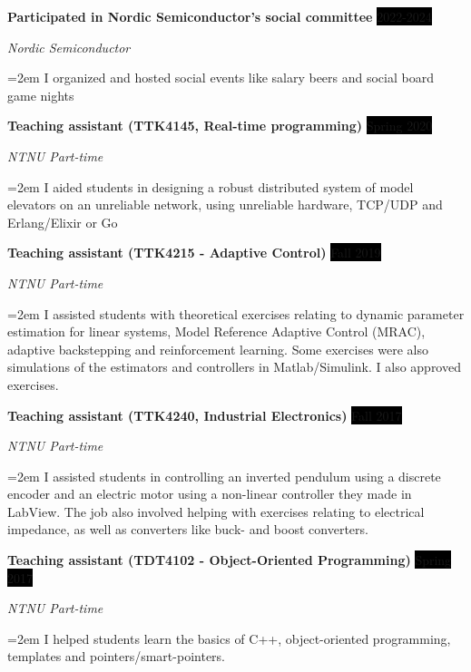 \documentclass[paper=a4,fontsize=11pt,norsk]{scrartcl} %
\newcommand{\EducationEntry}[4]{
		\noindent \textbf{#1} \hfill      %
		\colorbox{Black}{%
			\parbox{6em}{%
			\hfill\color{White}#2}} \par  %
		\noindent \textit{#3} \par        %
		\noindent\hangindent=2em\hangafter=0 \small #4 %
		\normalsize \par}
\newcommand{\WorkEntry}[4]{				  %
		\noindent \textbf{#1} \hfill      %
		\colorbox{Black}{\color{White}#2} \par  %
		\noindent \textit{#3} \par              %
		\noindent\hangindent=2em\hangafter=0 \small #4 %
		\normalsize \par}
\begin{document}




\WorkEntry{Participated in Nordic Semiconductor's social committee}{2022-2024}{Nordic Semiconductor}
{I organized and hosted social events like salary beers and social board game nights}

\WorkEntry{Teaching assistant (TTK4145, Real-time programming)}{Spring 2020}{NTNU Part-time}
{I aided students in designing a robust distributed system of model elevators on an unreliable network, using unreliable hardware, TCP/UDP and Erlang/Elixir or Go}

\WorkEntry{Teaching assistant (TTK4215 - Adaptive Control)}{Fall 2019}{NTNU Part-time}
{I assisted students with theoretical exercises relating to dynamic parameter estimation for linear systems, Model Reference Adaptive Control (MRAC), adaptive backstepping and reinforcement learning. Some exercises were also simulations of the estimators and controllers in Matlab/Simulink. I also approved exercises.
}


\WorkEntry{Teaching assistant (TTK4240, Industrial Electronics)}{Fall 2017}{NTNU Part-time}
{I assisted students in controlling an inverted pendulum using a discrete encoder and an electric motor using a non-linear controller they made in LabView. The job also involved helping with exercises relating to electrical impedance, as well as converters like buck- and boost converters.
}

\WorkEntry{Teaching assistant (TDT4102 - Object-Oriented Programming)}{Spring 2017}{NTNU Part-time}
{I helped students learn the basics of C++, object-oriented programming, templates and pointers/smart-pointers.
}
\end{document}
